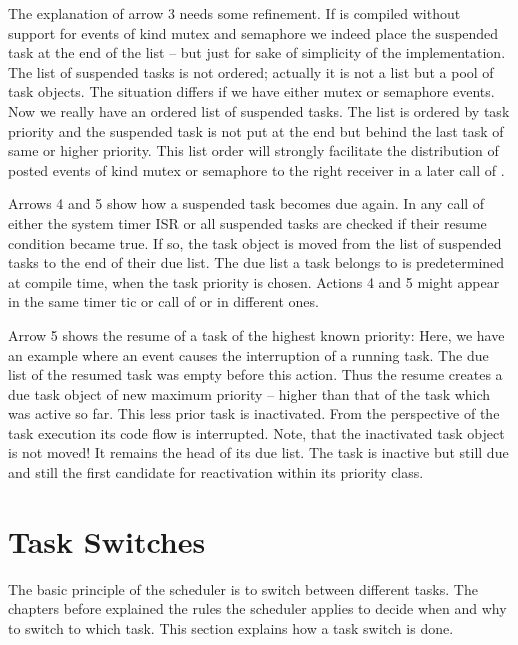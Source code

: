 The explanation of arrow 3 needs some refinement. If \rtos{} is compiled
without support for events of kind mutex and semaphore we indeed
place the suspended task at the end of the list -- but just for sake of
simplicity of the implementation. The list of suspended tasks is not
ordered; actually it is not a list but a pool of task objects. The
situation differs if we have either mutex or semaphore events. Now we
really have an ordered list of suspended tasks. The list is ordered by
task priority and the suspended task is not put at the end but behind the
last task of same or higher priority. This list order will strongly
facilitate the distribution of posted events of kind mutex or semaphore to
the right receiver in a later call of .

Arrows 4 and 5 show how a suspended task becomes due again. In any call of
either the system timer ISR or  all suspended tasks are
checked if their resume condition became true. If so, the task object is
moved from the list of suspended tasks to the end of their due list. The
due list a task belongs to is predetermined at compile time, when the task
priority is chosen. Actions 4 and 5 might appear in the same timer tic or
call of  or in different ones.

Arrow 5 shows the resume of a task of the highest known priority: Here, we
have an example where an event causes the interruption of a running task.
The due list of the resumed task was empty before this action. Thus the
resume creates a due task object of new maximum priority -- higher than
that of the task which was active so far. This less prior task is
inactivated. From the perspective of the task execution its code flow is
interrupted. Note, that the inactivated task object is not moved! It
remains the head of its due list. The task is inactive but still due and
still the first candidate for reactivation within its priority class.


\section{Task Switches}

The basic principle of the scheduler is to switch between different tasks.
The chapters before explained the rules the scheduler applies to decide
when and why to switch to which task. This section explains how a task
switch is done.

